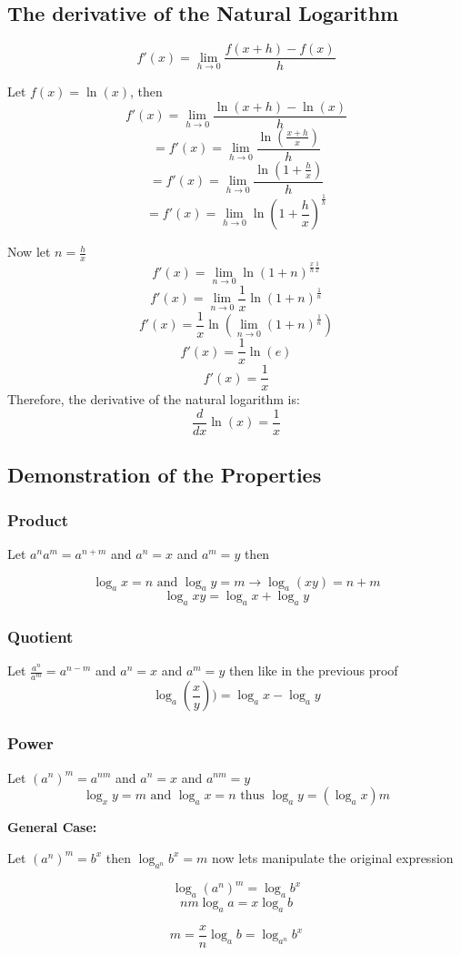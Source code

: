 \subsection{The derivative of the Natural Logarithm}

\[
f\prime(x) = \lim_{h \to 0} \frac{f(x + h) - f(x)}{h}
\]

 Let \(f(x) = \ln(x)\), then
\[
f\prime(x) = \lim_{h \to 0} \frac{\ln(x + h) - \ln(x)}{h}
\]
\[
= f\prime(x) = \lim_{h \to 0} \frac{\ln\left(\frac{x + h}{x}\right)}{h}
\]
\[
= f\prime(x) = \lim_{h \to 0} \frac{\ln\left(1 + \frac{h}{x}\right)}{h}
\]
\[
= f\prime(x) = \lim_{h \to 0} \ln\left(1 + \frac{h}{x}\right)^{\frac{1}{h}}
\]

 Now let \(n = \frac{h}{x}\)
\[
f\prime(x) = \lim_{n \to 0} \ln\left(1 + n\right)^{\frac{x}{h} \frac{1}{x}}
\]
\[
f\prime(x) = \lim_{n \to 0} \frac{1}{x} \ln\left(1 + n\right)^{\frac{1}{n}}
\]
\[
f\prime(x) = \frac{1}{x} \ln \left(\lim_{n \to 0} (1 + n)^{\frac{1}{n}}\right)
\]
\[
f\prime(x) = \frac{1}{x} \ln(e)
\]
\[
f\prime(x) = \frac{1}{x}
\]
 Therefore, the derivative of the natural logarithm is:
\[
\frac{d}{dx} \ln(x) = \frac{1}{x}
\]
\QED

\subsection{Demonstration of the Properties}

\subsubsection{Product}

Let \(a^n a^m = a^{n + m}\) and \(a^n = x\) and \(a^m = y\) then

\[
\log_a x = n \text{ and } \log_a y = m \rightarrow \log_a (xy) = n + m
\]
\[
\log_a xy = \log_a x + \log_a y
\]
\QED

\subsubsection{Quotient}

Let \(\frac{a^n}{a^m} = a^{n - m}\) and \(a^n = x\) and \(a^m = y\) then like in the previous proof
\[
\log_a \left(\frac{x}{y}\right)) = \log_a x - \log_a y
\]
\QED 

\subsubsection{Power}

Let \((a^n)^m = a^{nm}\) and \(a^n = x\) and \(a^{nm} = y\)
\[
\log_x y = m \text{ and } \log_a x = n \text{ thus } \log_a y = (\log_a x )m
\]
\QED

\textbf{General Case:}

Let \((a^n)^m = b^x\) then \(\log_{a^n} b^x = m\) now lets manipulate the original expression

\[
\log_a (a^n)^m = \log_a b^x
\]
\[
nm \log_a a = x \log_a b
\]

\[
m = \frac{x}{n} \log_a b =  \log_{a^n} b^x
\]

\QED


\newpage
